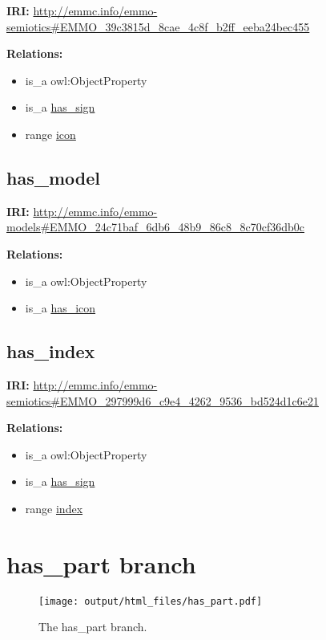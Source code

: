 \documentclass[a4paper,]{report}
\providecommand{\tightlist}{%
  \setlength{\itemsep}{0pt}\setlength{\parskip}{0pt}}
\begin{document}
\textbf{IRI:}
\url{http://emmc.info/emmo-semiotics\#EMMO_39c3815d_8cae_4c8f_b2ff_eeba24bec455}

\textbf{Relations:}

\begin{itemize}
\tightlist
\item
  is\_a owl:ObjectProperty
\item
  is\_a \protect\hyperlink{has_sign}{has\_sign}
\item
  range \protect\hyperlink{icon}{icon}
\end{itemize}

\hypertarget{has_model}{%
\subsection{has\_model}\label{has_model}}

\textbf{IRI:}
\url{http://emmc.info/emmo-models\#EMMO_24c71baf_6db6_48b9_86c8_8c70cf36db0c}

\textbf{Relations:}

\begin{itemize}
\tightlist
\item
  is\_a owl:ObjectProperty
\item
  is\_a \protect\hyperlink{has_icon}{has\_icon}
\end{itemize}

\hypertarget{has_index}{%
\subsection{has\_index}\label{has_index}}

\textbf{IRI:}
\url{http://emmc.info/emmo-semiotics\#EMMO_297999d6_c9e4_4262_9536_bd524d1c6e21}

\textbf{Relations:}

\begin{itemize}
\tightlist
\item
  is\_a owl:ObjectProperty
\item
  is\_a \protect\hyperlink{has_sign}{has\_sign}
\item
  range \protect\hyperlink{index}{index}
\end{itemize}

\hypertarget{has_part-branch}{%
\section{has\_part branch}\label{has_part-branch}}

\begin{figure}
\centering
\texttt{[image: output/html\_files/has\_part.pdf]}
\caption{The has\_part branch.}
\end{figure}
\end{document}
